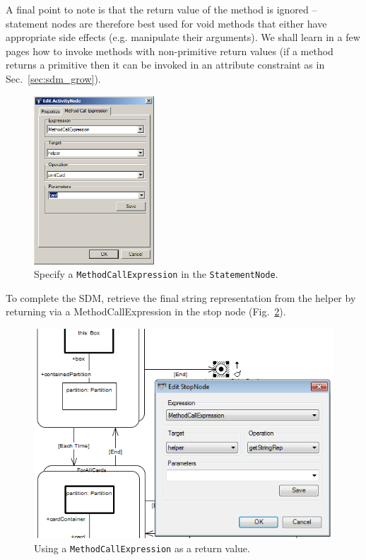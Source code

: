 A final point to note is that the
return value of the method is ignored -- statement nodes are therefore best used
for void methods that either have appropriate side effects (e.g. manipulate
their arguments).  We shall learn in a few pages how to invoke
methods with non-primitive return values (if a method returns a primitive then it can be
invoked in an attribute constraint as in Sec.~\ref{sec:sdm_grow}).

\begin{figure}[htbp]
\begin{center}
  \includegraphics[width=0.4\textwidth]{pics/sdmBilder/toString/sdm74}
  \caption{Specify a \texttt{MethodCallExpression} in the
  \texttt{StatementNode}.}
  \label{fig:sdm_tostring_3}
\end{center}
\end{figure}

To complete the SDM, retrieve the final string representation from the helper by
returning via a MethodCallExpression in the stop node
(Fig.~\ref{fig:sdm_tostring_4}). 

\begin{figure}[htbp]
\begin{center}
  \includegraphics[width=\textwidth]{pics/sdmBilder/toString/sdm75}
  \caption{Using a \texttt{MethodCallExpression} as a return value.}  
  \label{fig:sdm_tostring_4}
\end{center}
\end{figure}

